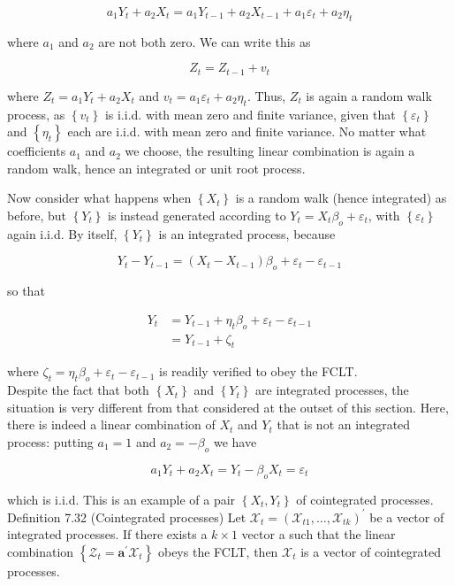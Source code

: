 \documentclass[10pt]{article}
\begin{document}
$$
a_{1} Y_{t}+a_{2} X_{t}=a_{1} Y_{t-1}+a_{2} X_{t-1}+a_{1} \varepsilon_{t}+a_{2} \eta_{t}
$$

where $a_{1}$ and $a_{2}$ are not both zero. We can write this as

$$
Z_{t}=Z_{t-1}+v_{t}
$$

where $Z_{t}=a_{1} Y_{t}+a_{2} X_{t}$ and $v_{t}=a_{1} \varepsilon_{t}+a_{2} \eta_{t}$. Thus, $Z_{t}$ is again a random walk process, as $\left\{v_{t}\right\}$ is i.i.d. with mean zero and finite variance, given that $\left\{\varepsilon_{t}\right\}$ and $\left\{\eta_{t}\right\}$ each are i.i.d. with mean zero and finite variance. No matter what coefficients $a_{1}$ and $a_{2}$ we choose, the resulting linear combination is again a random walk, hence an integrated or unit root process.

Now consider what happens when $\left\{X_{t}\right\}$ is a random walk (hence integrated) as before, but $\left\{Y_{t}\right\}$ is instead generated according to $Y_{t}=X_{t} \beta_{o}+\varepsilon_{t}$, with $\left\{\varepsilon_{t}\right\}$ again i.i.d. By itself, $\left\{Y_{t}\right\}$ is an integrated process, because

$$
Y_{t}-Y_{t-1}=\left(X_{t}-X_{t-1}\right) \beta_{o}+\varepsilon_{t}-\varepsilon_{t-1}
$$

so that

$$
\begin{aligned}
Y_{t} & =Y_{t-1}+\eta_{t} \beta_{o}+\varepsilon_{t}-\varepsilon_{t-1} \\
& =Y_{t-1}+\zeta_{t}
\end{aligned}
$$

where $\zeta_{t}=\eta_{t} \beta_{o}+\varepsilon_{t}-\varepsilon_{t-1}$ is readily verified to obey the FCLT.\\
Despite the fact that both $\left\{X_{t}\right\}$ and $\left\{Y_{t}\right\}$ are integrated processes, the situation is very different from that considered at the outset of this section. Here, there is indeed a linear combination of $X_{t}$ and $Y_{t}$ that is not an integrated process: putting $a_{1}=1$ and $a_{2}=-\beta_{o}$ we have

$$
a_{1} Y_{t}+a_{2} X_{t}=Y_{t}-\beta_{o} X_{t}=\varepsilon_{t}
$$

which is i.i.d. This is an example of a pair $\left\{X_{t}, Y_{t}\right\}$ of cointegrated processes.\\
Definition 7.32 (Cointegrated processes) Let $\mathcal{X}_{t}=\left(\mathcal{X}_{t 1}, \ldots, \mathcal{X}_{t k}\right)^{\prime}$ be a vector of integrated processes. If there exists a $k \times 1$ vector a such that the linear combination $\left\{\mathcal{Z}_{t}=\mathbf{a}^{\prime} \boldsymbol{\mathcal { X }}_{t}\right\}$ obeys the FCLT, then $\boldsymbol{\mathcal { X }}_{t}$ is a vector of cointegrated processes.
\end{document}
